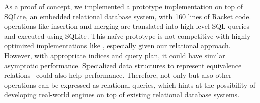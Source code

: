 As a proof of concept, we implemented a prototype \egraph implementation on top of SQLite,
 an embedded relational database system, with 160 lines of Racket code.
\Egraph operations like insertion and merging are translated into
 high-level SQL queries and executed
 using SQLite.
This na\"ive prototype is not competitive with highly optimized
 implementations like \egg,
 especially given our relational \ematching approach.
However, with appropriate indices and query plan,
 it could have similar asymptotic performance.
Specialized data structures to represent equivalence relations~\cite{nappa2019fast}
 could also help performance.
Therefore, not only \ematching but also other \egraph operations can be
 expressed as relational queries,
 which hints at the possibility of developing real-world \egraph engines
 on top of existing relational database systems.








